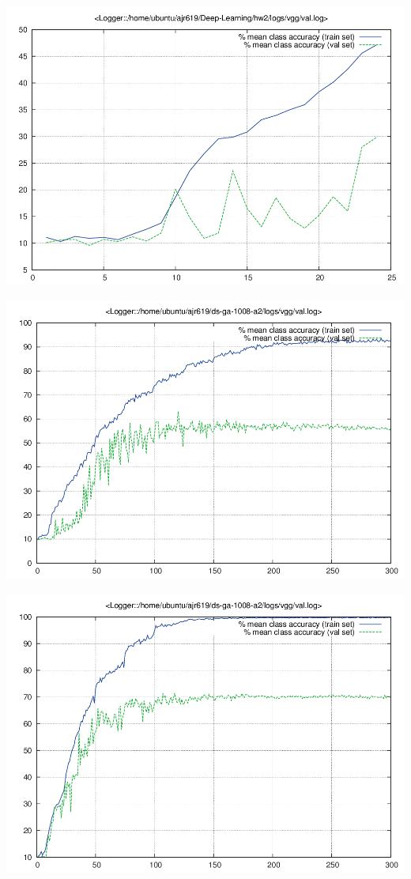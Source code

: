 \documentclass{article}
\begin{document}
\begin{centering}
\includegraphics[scale=0.3]{images/vgg/val.png}
\end{centering}

\begin{centering}
\includegraphics[scale=0.3]{images/vggInDS-ga/val.png}
\end{centering}

\begin{centering}
\includegraphics[scale=0.3]{images/logs_default/val.png}
\end{centering}
\end{document}
